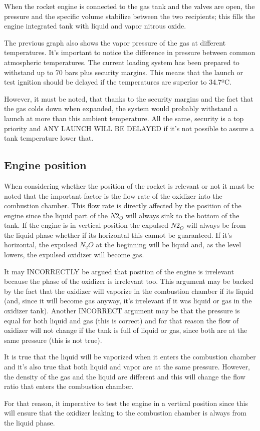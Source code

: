 When the rocket engine is connected to the gas tank and the valves are open, the pressure and the specific volume stabilize between the two recipients; this fills the engine integrated tank with liquid and vapor nitrous oxide.

The previous graph also shows the vapor pressure of the gas at different temperatures. It's important to notice the difference in pressure between common atmospheric temperatures. The current loading system has been prepared to withstand up to 70 bars plus security margins. This means that the launch or test ignition should be delayed if the temperatures are superior to 34.7ºC.

However, it must be noted, that thanks to the security margins and the fact that the gas colds down when expanded, the system would probably withstand a launch at more than this ambient temperature. All the same, security is a top priority and ANY LAUNCH WILL BE DELAYED if it's not possible to assure a tank temperature lower that.

\subsection*{Engine position}

When considering whether the position of the rocket is relevant or not it must be noted that the important factor is the flow rate of the oxidizer into the combustion chamber. This flow rate is directly affected by the position of the engine since the liquid part of the $N2_O$ will always sink to the bottom of the tank. If the engine is in vertical position the expulsed $N2_O$ will always be from the liquid phase whether if its horizontal this cannot be guaranteed. If it's horizontal, the expulsed $N_2O$ at the beginning will be liquid and, as the level lowers, the expulsed oxidizer will become gas.

It may INCORRECTLY be argued that position of the engine is irrelevant because the phase of the oxidizer is irrelevant too. This argument may be backed by the fact that the oxidizer will vaporize in the combustion chamber if its liquid (and, since it will become gas anyway, it's irrelevant if it was liquid or gas in the oxidizer tank). Another INCORRECT argument may be that the pressure is equal for both liquid and gas (this is correct) and for that reason the flow of oxidizer will not change if the tank is full of liquid or gas, since both are at the same pressure (this is not true).

It is true that the liquid will be vaporized when it enters the combustion chamber and it's also true that both liquid and vapor are at the same pressure. However, the density of the gas and the liquid are different and this will change the flow ratio that enters the combustion chamber.

For that reason, it imperative to test the engine in a vertical position since this will ensure that the oxidizer leaking to the combustion chamber is always from the liquid phase.